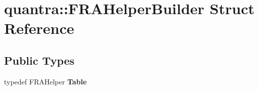 \hypertarget{structquantra_1_1FRAHelperBuilder}{}\section{quantra\+:\+:F\+R\+A\+Helper\+Builder Struct Reference}
\label{structquantra_1_1FRAHelperBuilder}
\subsection*{Public Types}
\begin{DoxyCompactItemize}
\item 
\mbox{\label{structquantra_1_1FRAHelperBuilder_a6528b224eb39842733e81f9ec6ef5f75}} 
typedef F\+R\+A\+Helper {\bfseries Table}
\end{DoxyCompactItemize}
